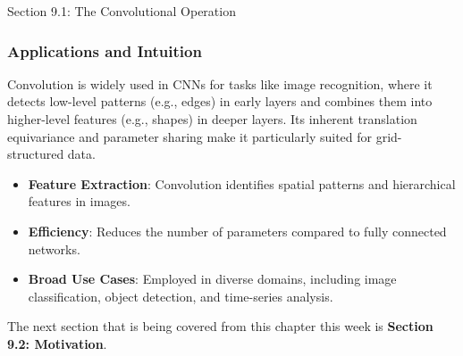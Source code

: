 \begin{notes}{Section 9.1: The Convolutional Operation}
    \subsubsection*{Applications and Intuition}
    
    Convolution is widely used in CNNs for tasks like image recognition, where it detects low-level patterns (e.g., edges) in early layers and combines them into higher-level features (e.g., shapes) in deeper 
    layers. Its inherent translation equivariance and parameter sharing make it particularly suited for grid-structured data.
    
    \begin{highlight}
        \begin{itemize}
            \item \textbf{Feature Extraction}: Convolution identifies spatial patterns and hierarchical features in images.
            \item \textbf{Efficiency}: Reduces the number of parameters compared to fully connected networks.
            \item \textbf{Broad Use Cases}: Employed in diverse domains, including image classification, object detection, and time-series analysis.
        \end{itemize}
    \end{highlight}
\end{notes}

The next section that is being covered from this chapter this week is \textbf{Section 9.2: Motivation}.

